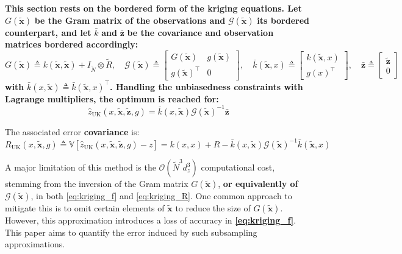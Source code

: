 \documentclass[preprint]{elsarticle}
\begin{document}
\textbf{This section rests on the bordered form of the kriging equations. Let} $G(\tilde{\mathbf{x}})$ \textbf{be the Gram matrix of the observations and} $\mathcal{G}(\tilde{\mathbf{x}})$ \textbf{its bordered counterpart, and let} $\bar{k}$ \textbf{and} $\bar{\mathbf{z}}$ \textbf{be the covariance and observation matrices bordered accordingly:}
\begin{equation}
    G(\tilde{\mathbf{x}})\triangleq k(\tilde{\mathbf{x}},\tilde{\mathbf{x}})+I_{\tilde{N}}\otimes\tilde{R},\quad\mathcal{G}(\tilde{\mathbf{x}})\triangleq\begin{bmatrix}G(\tilde{\mathbf{x}})&g(\tilde{\mathbf{x}})\\g(\tilde{\mathbf{x}})^\top&0\end{bmatrix},\quad\bar{k}(\tilde{\mathbf{x}},x)\triangleq\begin{bmatrix}k(\tilde{\mathbf{x}},x)\\g(x)^\top\end{bmatrix},\quad\bar{\mathbf{z}}\triangleq\begin{bmatrix}\tilde{\mathbf{z}}\\0\end{bmatrix}
\end{equation}
\textbf{with} $\bar{k}(x,\tilde{\mathbf{x}})\triangleq\bar{k}(\tilde{\mathbf{x}},x)^\top$\textbf{. Handling the unbiasedness constraints with Lagrange multipliers, the optimum is reached for:}
\begin{equation}
    \hat{z}_{\mathrm{UK}}(x,\tilde{\mathbf{x}},\tilde{\mathbf{z}},g)=\bar{k}(x,\tilde{\mathbf{x}})\mathcal{G}(\tilde{\mathbf{x}})^{-1}\bar{\mathbf{z}}\label{eq:kriging_f}
\end{equation}

The associated error \textbf{covariance} is:
\begin{equation}
    R_{\mathrm{UK}}(x,\tilde{\mathbf{x}},g)\triangleq\mathbb{V}\left[\hat{z}_{\mathrm{UK}}(x,\tilde{\mathbf{x}},\tilde{\mathbf{z}},g)-z\right]=k(x,x)+R-\bar{k}(x,\tilde{\mathbf{x}})\mathcal{G}(\tilde{\mathbf{x}})^{-1}\bar{k}(\tilde{\mathbf{x}},x)\label{eq:kriging_R}
\end{equation}

A major limitation of this method is the $\mathcal{O}(\tilde{N}^3d_z^3)$ computational cost, stemming from the inversion of the Gram matrix $G(\tilde{\mathbf{x}})$, \textbf{or equivalently of} $\mathcal{G}(\tilde{\mathbf{x}})$, in both \eqref{eq:kriging_f} and \eqref{eq:kriging_R}. One common approach to mitigate this is to omit certain elements of $\tilde{\mathbf{x}}$ to reduce the size of $G(\tilde{\mathbf{x}})$. However, this approximation introduces a loss of accuracy in \textbf{\eqref{eq:kriging_f}}. This paper aims to quantify the error induced by such subsampling approximations.
\end{document}
